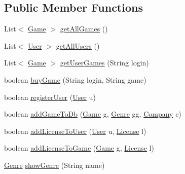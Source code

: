 \subsection*{Public Member Functions}
\begin{DoxyCompactItemize}
\item 
List$<$ \hyperlink{classes_1_1deusto_1_1server_1_1db_1_1data_1_1_game}{Game} $>$ \hyperlink{interfacees_1_1deusto_1_1server_1_1db_1_1_i_d_b_a76af81d4bb71c81490da92d67c5b6d03}{get\+All\+Games} ()
\item 
List$<$ \hyperlink{classes_1_1deusto_1_1server_1_1db_1_1data_1_1_user}{User} $>$ \hyperlink{interfacees_1_1deusto_1_1server_1_1db_1_1_i_d_b_ab2893cf6b112e1789b5a9e62f5156f6a}{get\+All\+Users} ()
\item 
List$<$ \hyperlink{classes_1_1deusto_1_1server_1_1db_1_1data_1_1_game}{Game} $>$ \hyperlink{interfacees_1_1deusto_1_1server_1_1db_1_1_i_d_b_ac5ef9780a640140576f9373f8b57631c}{get\+User\+Games} (String login)
\item 
boolean \hyperlink{interfacees_1_1deusto_1_1server_1_1db_1_1_i_d_b_ab1076d02bd6b4da29d0e99e1310048b6}{buy\+Game} (String login, String game)
\item 
boolean \hyperlink{interfacees_1_1deusto_1_1server_1_1db_1_1_i_d_b_ad9ecf628cb97ade7cb1b10fd1b3a18c4}{register\+User} (\hyperlink{classes_1_1deusto_1_1server_1_1db_1_1data_1_1_user}{User} u)
\item 
boolean \hyperlink{interfacees_1_1deusto_1_1server_1_1db_1_1_i_d_b_a645335b2cbfa27c0199783ff2f33559e}{add\+Game\+To\+Db} (\hyperlink{classes_1_1deusto_1_1server_1_1db_1_1data_1_1_game}{Game} g, \hyperlink{classes_1_1deusto_1_1server_1_1db_1_1data_1_1_genre}{Genre} gg, \hyperlink{classes_1_1deusto_1_1server_1_1db_1_1data_1_1_company}{Company} c)
\item 
boolean \hyperlink{interfacees_1_1deusto_1_1server_1_1db_1_1_i_d_b_ab2c9cbce259134d238e56eea5d0134c5}{add\+License\+To\+User} (\hyperlink{classes_1_1deusto_1_1server_1_1db_1_1data_1_1_user}{User} u, \hyperlink{classes_1_1deusto_1_1server_1_1db_1_1data_1_1_license}{License} l)
\item 
boolean \hyperlink{interfacees_1_1deusto_1_1server_1_1db_1_1_i_d_b_a6ca49e0ed9bd7826c4ee65cb5f0f583b}{add\+License\+To\+Game} (\hyperlink{classes_1_1deusto_1_1server_1_1db_1_1data_1_1_game}{Game} g, \hyperlink{classes_1_1deusto_1_1server_1_1db_1_1data_1_1_license}{License} l)
\item 
\hyperlink{classes_1_1deusto_1_1server_1_1db_1_1data_1_1_genre}{Genre} \hyperlink{interfacees_1_1deusto_1_1server_1_1db_1_1_i_d_b_a9023bdad77781d95fc2e556d1935f763}{show\+Genre} (String name)

\end{DoxyCompactItemize}
